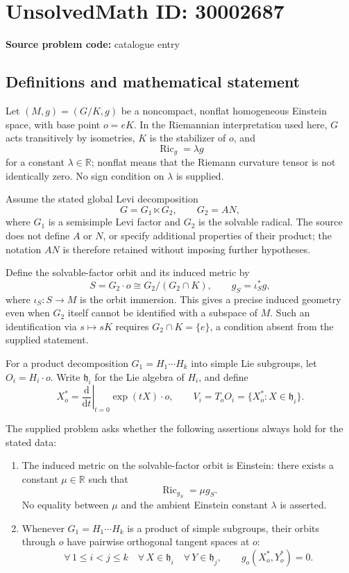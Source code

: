 \documentclass[11pt]{article}
\newcommand{\R}{\mathbb{R}}
\begin{document}
\section*{UnsolvedMath ID: 30002687}
\textbf{Source problem code:} catalogue entry
\subsection{Definitions and mathematical statement}
Let \((M,g)=(G/K,g)\) be a noncompact, nonflat homogeneous Einstein space, with base point \(o=eK\). In the Riemannian interpretation used here, \(G\) acts transitively by isometries, \(K\) is the stabilizer of \(o\), and
\[
\operatorname{Ric}_g=\lambda g
\]
for a constant \(\lambda\in\R\); nonflat means that the Riemann curvature tensor is not identically zero. No sign condition on \(\lambda\) is supplied.

Assume the stated global Levi decomposition
\[
G=G_1\ltimes G_2,\qquad G_2=AN,
\]
where \(G_1\) is a semisimple Levi factor and \(G_2\) is the solvable radical. The source does not define \(A\) or \(N\), or specify additional properties of their product; the notation \(AN\) is therefore retained without imposing further hypotheses.

Define the solvable-factor orbit and its induced metric by
\[
S=G_2\cdot o\cong G_2/(G_2\cap K),\qquad g_S=\iota_S^*g,
\]
where \(\iota_S:S\longrightarrow M\) is the orbit immersion. This gives a precise induced geometry even when \(G_2\) itself cannot be identified with a subspace of \(M\). Such an identification via \(s\mapsto sK\) requires \(G_2\cap K=\{e\}\), a condition absent from the supplied statement.

For a product decomposition \(G_1=H_1\cdots H_k\) into simple Lie subgroups, let \(O_i=H_i\cdot o\). Write \(\mathfrak h_i\) for the Lie algebra of \(H_i\), and define
\[
X_o^*=\left.\frac{\mathrm d}{\mathrm dt}\right|_{t=0}\exp(tX)\cdot o,
\qquad
V_i=T_oO_i=\{X_o^*:X\in\mathfrak h_i\}.
\]

The supplied problem asks whether the following assertions always hold for the stated data:
\begin{enumerate}
\item The induced metric on the solvable-factor orbit is Einstein: there exists a constant \(\mu\in\R\) such that
\[
\operatorname{Ric}_{g_S}=\mu g_S.
\]
No equality between \(\mu\) and the ambient Einstein constant \(\lambda\) is asserted.
\item Whenever \(G_1=H_1\cdots H_k\) is a product of simple subgroups, their orbits through \(o\) have pairwise orthogonal tangent spaces at \(o\):
\[
\forall\,1\leq i<j\leq k\quad
\forall\,X\in\mathfrak h_i\quad
\forall\,Y\in\mathfrak h_j,\qquad
 g_o(X_o^*,Y_o^*)=0.
\]
\end{enumerate}
\end{document}
